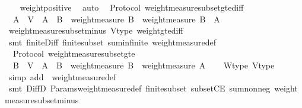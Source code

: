\begin{isabellebody}
%
\isadelimproof
\ \ %
\endisadelimproof
%
\isatagproof
{}\isamarkupfalse%
\ weight{\isacharunderscore}positive\ \isamarkupfalse%
\ auto%
\endisatagproof
{\isafoldproof}%
%
\isadelimproof
\isanewline
%
\endisadelimproof
\isanewline
{}\isamarkupfalse%
\ {\isacharparenleft}\ Protocol{\isacharparenright}\ weight{\isacharunderscore}measure{\isacharunderscore}subset{\isacharunderscore}gte{\isacharunderscore}diff\ {\isacharcolon}\isanewline
\ \ {\isachardoublequoteopen}A\ {\isasymsubseteq}\ V\ {\isasymLongrightarrow}\ A\ {\isasymsubseteq}\ B\ {\isasymLongrightarrow}\ weight{\isacharunderscore}measure\ B\ {\isasymge}\ weight{\isacharunderscore}measure\ {\isacharparenleft}B\ {\isacharminus}\ A{\isacharparenright}{\isachardoublequoteclose}\isanewline
%
\isadelimproof
\ \ %
\endisadelimproof
%
\isatagproof
{}\isamarkupfalse%
\ weight{\isacharunderscore}measure{\isacharunderscore}subset{\isacharunderscore}minus\ V{\isacharunderscore}type\ weight{\isacharunderscore}gte{\isacharunderscore}diff\isanewline
\ \ \isamarkupfalse%
\ {\isacharparenleft}smt\ finite{\isacharunderscore}Diff{}\ finite{\isacharunderscore}subset\ sum{\isachardot}infinite\ weight{\isacharunderscore}measure{\isacharunderscore}def{\isacharparenright}%
\endisatagproof
{\isafoldproof}%
%
\isadelimproof
\isanewline
%
\endisadelimproof
\isanewline
{}\isamarkupfalse%
\ {\isacharparenleft}\ Protocol{\isacharparenright}\ weight{\isacharunderscore}measure{\isacharunderscore}subset{\isacharunderscore}gte\ {\isacharcolon}\isanewline
\ \ {\isachardoublequoteopen}B\ {\isasymsubseteq}\ V\ {\isasymLongrightarrow}\ A\ {\isasymsubseteq}\ B\ {\isasymLongrightarrow}\ weight{\isacharunderscore}measure\ B\ {\isasymge}\ weight{\isacharunderscore}measure\ A{\isachardoublequoteclose}\isanewline
%
\isadelimproof
\ \ %
\endisadelimproof
%
\isatagproof
{}\isamarkupfalse%
\ W{\isacharunderscore}type\ V{\isacharunderscore}type\isanewline
\ \ \isamarkupfalse%
\ {\isacharparenleft}simp\ add{\isacharcolon}\ \ weight{\isacharunderscore}measure{\isacharunderscore}def{\isacharparenright}\isanewline
\ \ \isamarkupfalse%
\ {\isacharparenleft}smt\ DiffD{}\ Params{\isachardot}weight{\isacharunderscore}measure{\isacharunderscore}def\ finite{\isacharunderscore}subset\ subsetCE\ sum{\isacharunderscore}nonneg\ weight{\isacharunderscore}measure{\isacharunderscore}subset{\isacharunderscore}minus{\isacharparenright}%
\endisatagproof
{\isafoldproof}%

\end{isabellebody}
